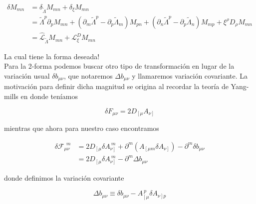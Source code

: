 \documentclass{article}
\numberwithin{equation}{section}
\begin{document}
\begin{boxeq}
	\begin{equation}
	\begin{aligned}
	\delta M_{m n} &= \delta_{\widetilde{\Lambda}} M_{m n} + \delta_{\xi} M_{m n}\\
	&= \widetilde{\Lambda}^p \partial_p M_{m n} + \left(\partial_m \widetilde{\Lambda}^p - \partial_p \widetilde{\Lambda}_m\right) M_{p n} + \left(\partial_n \widetilde{\Lambda}^p - \partial_p \widetilde{\Lambda}_n\right) M_{m p} + \xi^{\rho} D_{\rho} M_{m n}\\
	&= \hat{\mathcal{L}}_{\widetilde{\Lambda}} M_{m n} + \mathcal{L}_{\xi}^D M_{m n}
	\end{aligned}
	\end{equation}
\end{boxeq}

La cual tiene la forma deseada!\\

Para la 2-forma podemos buscar otro tipo de transformación en lugar de la variación usual $ \delta b_{\mu \nu} $, que notaremos $ \Delta b_{\mu \nu} $ y llamaremos variación covariante. La motivación para definir dicha magnitud se origina al recordar la teoría de Yang-mills en donde teníamos

\begin{equation}
\delta F_{\mu \nu} = 2 D_{\left[\mu \right.} A_{\left.\nu \right]} 
\end{equation}

mientras que ahora para nuestro caso encontramos

\begin{equation}\label{deltaFcovariante}
\begin{aligned}
\delta \mathcal{F}_{\mu \nu}^{\ \ m} &= 2 D_{\left[\mu \right.} \delta A_{\left.\nu \right]}^{\ m } + \partial^m \left( A_{\left[\mu m \right.} \delta A_{\left.\nu \right]}\right) - \partial^m \delta b_{\mu \nu}\\
&= 2 D_{\left[\mu \right.} \delta A_{\left.\nu \right]}^{\ m } - \partial^m \Delta b_{\mu \nu}
\end{aligned}
\end{equation}

donde definimos la variación covariante

\begin{equation}\label{variacioncovariante}
\Delta b_{\mu \nu} \equiv \delta b_{\mu \nu} - A_{\left[\mu \right.}^{\ p} \delta A_{\left.\nu \right] p}
\end{equation}
\end{document}
